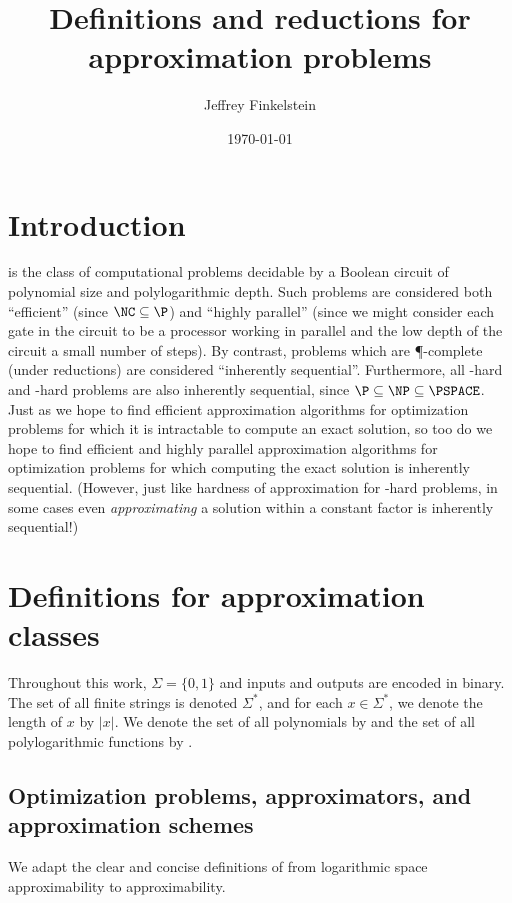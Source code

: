 \documentclass[]{article}
\author{Jef{}frey Finkelstein}
\date{\today}
\title{Definitions and reductions for \texorpdfstring{\NC}{NC} approximation problems}
\theoremstyle{definition} \newtheorem{definition}{Definition}
\theoremstyle{definition} \newtheorem{openquestion}{Open question}
\begin{document}
\maketitle

\section{Introduction}

\NC{} is the class of computational problems decidable by a Boolean circuit of polynomial size and polylogarithmic depth.
Such problems are considered both ``efficient'' (since $\NC\subseteq\P$) and ``highly parallel'' (since we might consider each gate in the circuit to be a processor working in parallel and the low depth of the circuit a small number of steps).
By contrast, problems which are \P-complete (under \NC{} reductions) are considered ``inherently sequential''.
Furthermore, all \NP-hard and \PSPACE-hard problems are also inherently sequential, since $\P\subseteq\NP\subseteq\PSPACE$.
Just as we hope to find efficient approximation algorithms for optimization problems for which it is intractable to compute an exact solution, so too do we hope to find efficient and highly parallel approximation algorithms for optimization problems for which computing the exact solution is inherently sequential.
(However, just like hardness of approximation for \NP-hard problems, in some cases even \emph{approximating} a solution within a constant factor is inherently sequential!)

\section{Definitions for \texorpdfstring{\NC}{NC} approximation classes}

Throughout this work, $\Sigma=\{0, 1\}$ and inputs and outputs are encoded in binary.
The set of all finite strings is denoted $\Sigma^*$, and for each $x\in\Sigma^*$, we denote the length of $x$ by $|x|$.
We denote the set of all polynomials by \poly{} and the set of all polylogarithmic functions by \polylog.

\subsection{Optimization problems, approximators, and approximation schemes}

We adapt the clear and concise definitions of \cite{tantau07} from logarithmic space approximability to \NC{} approximability.
\end{document}

